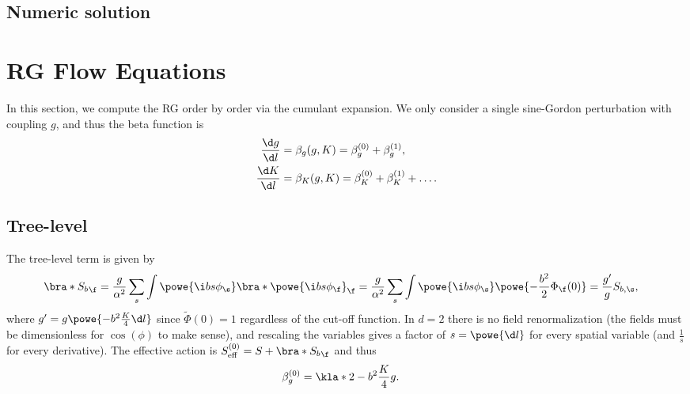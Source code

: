 \documentclass[english, parskip=full]{scrartcl}
\begin{document}
\subsection{Numeric solution}
%    
\section{RG Flow Equations}
In this section, we compute the RG order by order via the cumulant expansion.
We only consider a single sine-Gordon perturbation with coupling $g$, and thus the beta function is
\begin{align}
\frac{\d g}{\d l} &= \beta_g(g,K) = \beta_g^{(0)} + \beta_g^{(1)},\\
\frac{\d K}{\d l} &= \beta_K(g,K) = \beta_K^{(0)} + \beta_K^{(1)} + \dots.
\end{align}
\subsection{Tree-level}
The tree-level term is given by
\begin{align}
\bra*{S_b}_\f &= \frac{g}{\alpha^2} \sum_s \int \powe{\i bs\phi_\s} \bra*{\powe{\i bs\phi_\f}}_\f = \frac{g}{\alpha^2} \sum_s \int \powe{\i bs\phi_\s} \powe{-\frac{b^2}{2} \Phi_\f(0)} = \frac{g'}{g} S_{b,\s},
\end{align}
where $g' = g\powe{-b^2\frac{K}{4} \d l}$ since $\tilde{\Phi}(0)=1$ regardless of the cut-off function.
In $d=2$ there is no field renormalization (the fields must be dimensionless for $\cos(\phi)$ to make sense), and rescaling the variables gives a factor of $s=\powe{\d l}$ for every spatial variable (and $\frac{1}{s}$ for every derivative).
The effective action is $S_\text{eff}^{(0)} = S + \bra*{S_b}_\f$ and thus
\begin{align}
\beta_g^{(0)} &= \kla*{2 - b^2 \frac{K}{4}} g.
\end{align}
\end{document}
